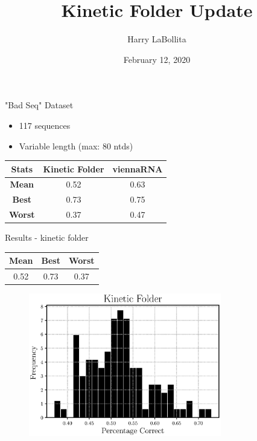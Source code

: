 \documentclass{beamer}
\author{Harry LaBollita}
\institute{Arizona State University}
\title{Kinetic Folder Update}
\date{February 12, 2020}
\begin{document}
\frame{\titlepage}

\begin{frame}{"Bad Seq" Dataset}

\begin{itemize}
\item 117 sequences
\item Variable length (max: 80 ntds)
\end{itemize}
\begin{table}
\centering
\begin{tabular}{|ccc|}
\hline
{\bf Stats} & {\bf Kinetic Folder} & {\bf viennaRNA}\\
\hline
\hline
{\bf Mean} & 0.52 & 0.63 \\
{\bf Best} & 0.73 & 0.75 \\
{\bf Worst} & 0.37 & 0.47\\
\hline
\end{tabular}
\end{table}
\end{frame}

\begin{frame}{Results - kinetic folder}
\begin{table}
\centering
\begin{tabular}{|ccc|}
\hline
{\bf Mean} & {\bf Best} & {\bf Worst}\\
\hline
\hline
0.52 & 0.73 & 0.37\\
\hline
\end{tabular}
\end{table}
\begin{figure}[H]
\centering
\includegraphics[width = 0.75\textwidth]{myfolder.eps}
\end{figure}
\end{frame}
\end{document}

